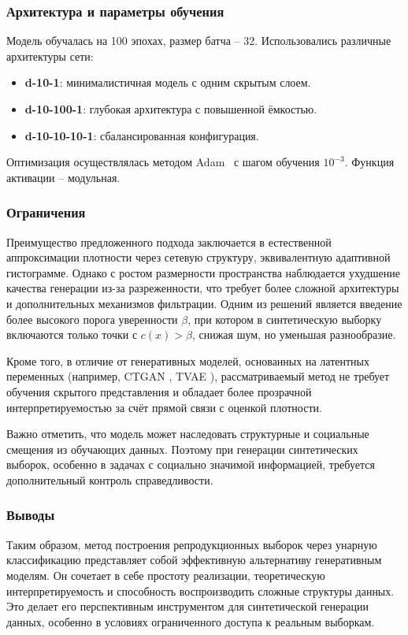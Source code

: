 \subsubsection{Архитектура и параметры обучения}

Модель обучалась на 100 эпохах, размер батча -- 32. Использовались различные архитектуры сети:
\begin{itemize}
  \item \textbf{d-10-1}: минималистичная модель с одним скрытым слоем.
  \item \textbf{d-10-100-1}: глубокая архитектура с повышенной ёмкостью.
  \item \textbf{d-10-10-10-1}: сбалансированная конфигурация.
\end{itemize}

Оптимизация осуществлялась методом Adam~\cite{adam2014method} с шагом обучения \(10^{-3}\). Функция активации -- модульная.

\subsubsection{Ограничения}

Преимущество предложенного подхода заключается в естественной аппроксимации плотности через сетевую структуру, эквивалентную адаптивной гистограмме. Однако с ростом размерности пространства наблюдается ухудшение качества генерации из-за разреженности, что требует более сложной архитектуры и дополнительных механизмов фильтрации. Одним из решений является введение более высокого порога уверенности \(\beta\), при котором в синтетическую выборку включаются только точки с \(c(x) > \beta\), снижая шум, но уменьшая разнообразие.

Кроме того, в отличие от генеративных моделей, основанных на латентных переменных (например, CTGAN \cite{habibi2023imbalanced}, TVAE \cite{ishfaq2018tvae}), рассматриваемый метод не требует обучения скрытого представления и обладает более прозрачной интерпретируемостью за счёт прямой связи с оценкой плотности.

Важно отметить, что модель может наследовать структурные и социальные смещения из обучающих данных. Поэтому при генерации синтетических выборок, особенно в задачах с социально значимой информацией, требуется дополнительный контроль справедливости.

\subsubsection{Выводы}

Таким образом, метод построения репродукционных выборок через унарную классификацию представляет собой эффективную альтернативу генеративным моделям. Он сочетает в себе простоту реализации, теоретическую интерпретируемость и способность воспроизводить сложные структуры данных. Это делает его перспективным инструментом для синтетической генерации данных, особенно в условиях ограниченного доступа к реальным выборкам.

